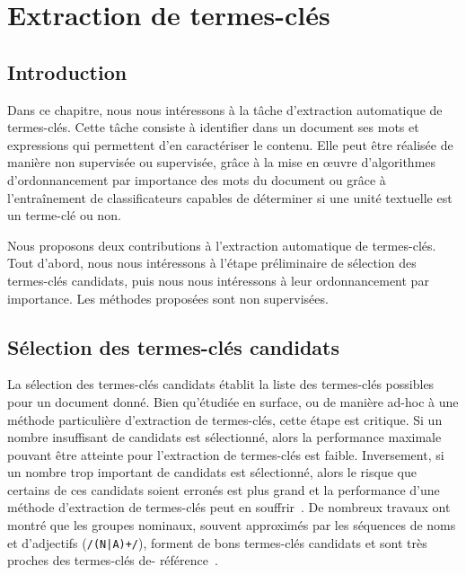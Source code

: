 \chapter{Extraction de termes-clés}
\label{chap:main-domain_independent_keyphrase_extraction}


  \section{Introduction}
  \label{sec:main:domain_independent_keyphrase_extraction-introduction}
    Dans ce chapitre, nous nous intéressons à la tâche d'extraction automatique
    de termes-clés. Cette tâche consiste à identifier dans un document ses mots
    et expressions qui permettent d'en caractériser le contenu. Elle peut être
    réalisée de manière non supervisée ou supervisée, grâce à la mise en
    \oe{}uvre d'algorithmes d'ordonnancement par importance des mots du document
    ou grâce à l'entraînement de classificateurs capables de déterminer si une
    unité textuelle est un terme-clé ou non.

    Nous proposons deux contributions à l'extraction automatique de termes-clés.
    Tout d'abord, nous nous intéressons à l'étape préliminaire de sélection des
    termes-clés candidats, puis nous nous intéressons à leur ordonnancement par
    importance. Les méthodes proposées sont non supervisées.


  \section{Sélection des termes-clés candidats}
  \label{sec:main:domain_independent_keyphrase_extraction-keyphrase_candidate_selection}
    La sélection des termes-clés candidats établit la liste des termes-clés
    possibles pour un document donné. Bien qu'étudiée en surface, ou de manière
    ad-hoc à une méthode particulière d'extraction de termes-clés, cette étape
    est critique. Si un nombre insuffisant de candidats est sélectionné, alors
    la performance maximale pouvant être atteinte pour l'extraction de
    termes-clés est faible. Inversement, si un nombre trop important de
    candidats est sélectionné, alors le risque que certains de ces candidats
    soient erronés est plus grand et la performance d'une méthode d'extraction
    de termes-clés peut en souffrir~\cite{hasan2014state_of_the_art}.
    De nombreux travaux ont montré que les groupes nominaux, souvent
    approximés par les séquences de noms et d'adjectifs (\texttt{/(N|A)+/}),
    forment de bons termes-clés candidats et sont très proches des termes-clés
    de-
    référence~\cite{barker2000nounphrasehead,hulth2003keywordextraction,wan2008expandrank}.

